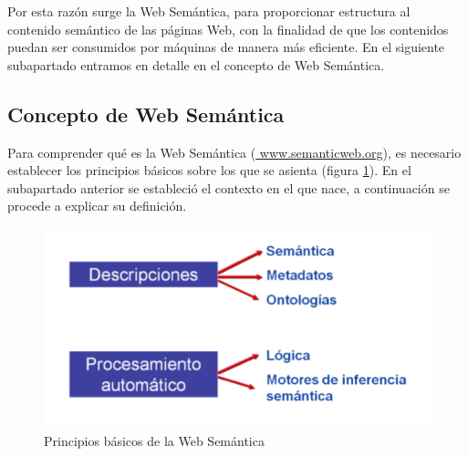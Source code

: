 

Por esta razón surge la Web Semántica, para proporcionar estructura al contenido semántico de las páginas Web, con la finalidad de que los contenidos puedan ser consumidos por máquinas de manera más eficiente. En el siguiente subapartado entramos en detalle en el concepto de Web Semántica.

\subsection{Concepto de Web Semántica} 

Para comprender qué es la Web Semántica (\url{ www.semanticweb.org}), es necesario establecer los principios básicos sobre los que se asienta (figura \ref{fig:principio}). En el subapartado anterior se estableció el contexto en el que nace, a continuación se procede a explicar su definición. 

\begin{figure}[H]
	\centering
	\includegraphics[width=0.56\linewidth]{imagenes/capitulo3/principio}
	\caption{Principios básicos de la Web Semántica \cite{aplicacion}}
	\label{fig:principio}
\end{figure}

